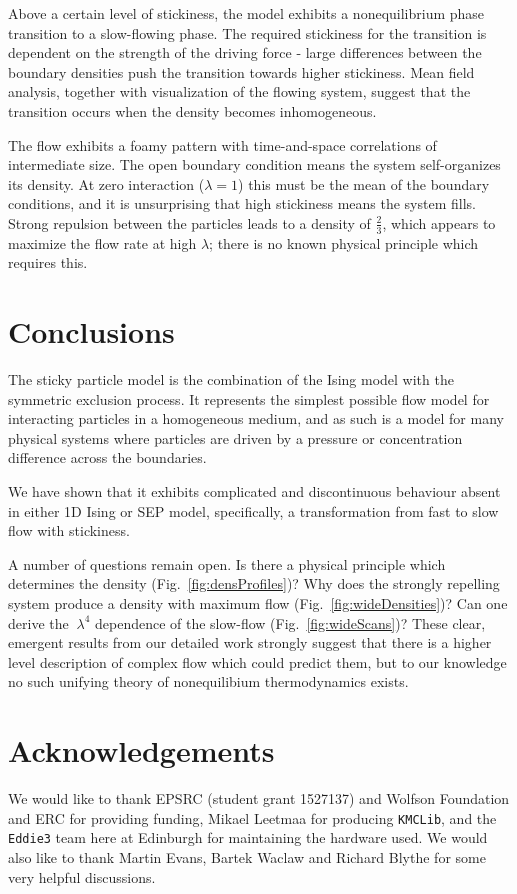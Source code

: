 \documentclass[
reprint, amsmath,amssymb, aps,
 pre, longbibliography,
]{revtex4-1}
\begin{document}
Above a certain level of stickiness, the model exhibits a
nonequilibrium phase transition to a slow-flowing phase.  The required
stickiness for the transition is dependent on the strength of the
driving force - large differences between the boundary densities push
the transition towards higher stickiness.  Mean field analysis, together
with visualization of the flowing system, suggest that the transition
occurs when the density becomes inhomogeneous.

The flow exhibits a foamy pattern with time-and-space
correlations of intermediate size.  
The open boundary condition means the system self-organizes its
density.  At zero interaction ($\lambda=1$) this must be the mean of
the boundary conditions, and it is unsurprising that high stickiness
means the system fills.  Strong repulsion between the particles leads
to a density of $\frac{2}{3}$, which appears to maximize the flow rate
at high $\lambda$; there is no known physical principle which requires this.

\section{Conclusions}

The sticky particle model is the combination of the Ising model with
the symmetric exclusion process.  It represents the simplest possible
flow model for interacting particles in a homogeneous medium, and as
such is a model for many physical systems where particles are driven
by a pressure or concentration difference across the boundaries.

We have shown that it exhibits complicated and discontinuous behaviour
absent in either 1D Ising or SEP model, specifically, a transformation
from fast to slow flow with stickiness. 

A number of questions remain open.  Is there a physical principle
which determines the density (Fig.~\ref{fig:densProfiles})?  Why does
the strongly repelling system produce a density with maximum flow
(Fig.~\ref{fig:wideDensities})?  Can one derive the $~\lambda^4$
dependence of the slow-flow (Fig.~\ref{fig:wideScans})?  These clear,
emergent results from our detailed work strongly suggest that there is a higher
level description of complex flow which could predict
them, but to our knowledge no such unifying theory of nonequilibium
thermodynamics exists.




\section*{Acknowledgements}
We would like to thank EPSRC (student grant 1527137) and Wolfson
Foundation and ERC for providing funding, Mikael Leetmaa for producing
\texttt{KMCLib}, and the \texttt{Eddie3} team here at Edinburgh for
maintaining the hardware used.  We would also like to thank Martin
Evans, Bartek Waclaw and Richard Blythe for some very helpful
discussions.
\end{document}
